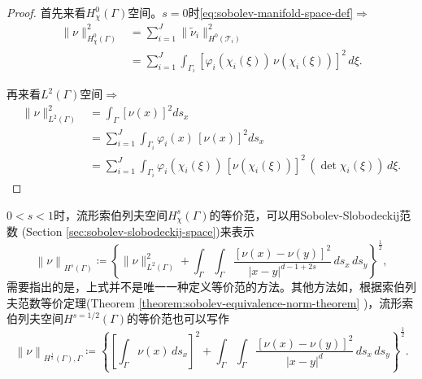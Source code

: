 \begin{proof}
  首先来看$H_{\chi}^{0}(\Gamma)$空间。$s=0$时\eqref{eq:sobolev-manifold-space-def}$\Rightarrow$
  \begin{equation*}
    \begin{split}
      \big\| \nu \big\|_{H_{\chi}^{0}(\Gamma)}^2 &=
      \sum_{i=1}^{J} \big\| \widetilde{\nu}_i \big\|_{H^{0}(\mathcal{T}_{i})}^{2} \\
      &= \sum_{i=1}^{J}
      \int_{\Gamma_i} \left[
      \varphi_i(\chi_i(\xi)) \, \nu(\chi_i(\xi))
      \right]^2 \, d\xi.
    \end{split}
  \end{equation*}

  再来看$L^{2}(\Gamma)$空间$\Rightarrow$
  \begin{equation*}
    \begin{split}
      \big\| \nu \big\|_{L^{2}(\Gamma)}^2
      &= \int_{\Gamma}
      \left[ \nu(x) \right]^2 d s_x \\
      &= \sum_{i=1}^{J} \int_{\Gamma_i} \varphi_i(x) \,
      \left[ \nu(x) \right]^2 d s_x \\
      &= \sum_{i=1}^{J} \int_{\Gamma_i} \varphi_i(\chi_i(\xi)) \,
      \left[ \nu(\chi_i(\xi)) \right]^2 \, \left( \det \chi_i(\xi) \right) \, d \xi.
    \end{split}
  \end{equation*}
\end{proof}

\begin{lemma}[流形索伯列夫空间的等价范($0 < s < 1$)]
  $0 < s < 1$时，流形索伯列夫空间$H_{\chi}^{s}(\Gamma)$的等价范，可以用Sobolev-Slobodeckij范数 (Section \ref{sec:sobolev-slobodeckij-space})来表示
  \begin{equation*}
    \left\| \nu \right\|_{H^s(\Gamma)} \coloneqq
    \left\{
    \big\| \nu \big\|_{L^{2}(\Gamma)}^2
    + \int_{\Gamma} \int_{\Gamma}
    \frac{
    \left[ \nu(x) - \nu(y) \right]^2
    }{
    \left| x - y \right|^{d - 1 + 2s}
    }
    \, d s_x \, d s_y
    \right\}^{\frac{1}{2}},
  \end{equation*}
  需要指出的是，上式并不是唯一一种定义等价范的方法。其他方法如，根据索伯列夫范数等价定理(Theorem \ref{theorem:sobolev-equivalence-norm-theorem} )，流形索伯列夫空间$H^{s=1/2}(\Gamma)$的等价范也可以写作
  \begin{equation*}
    \left\| \nu \right\|_{H^{\frac{1}{2}}(\Gamma), \Gamma} \coloneqq \left\{
    \left[
    \int_{\Gamma} \nu(x) \, d s_x
    \right]^2
    + \int_{\Gamma} \int_{\Gamma}
    \frac{
    \left[ \nu(x) - \nu(y) \right]^2
    }{
    \left| x - y \right| ^{d}
    }\,
    d s_x \, d s_y
    \right\}^{\frac{1}{2}}.
  \end{equation*}
\end{lemma}

